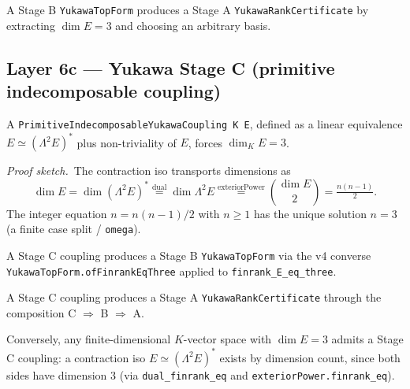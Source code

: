 \documentclass[11pt,a4paper]{article}
\begin{document}
\begin{theorem}
A Stage B \texttt{YukawaTopForm} produces a Stage A
\texttt{YukawaRankCertificate} by extracting $\dim E = 3$ and
choosing an arbitrary basis.
\end{theorem}

\subsection*{Layer 6c --- Yukawa Stage C (primitive indecomposable
coupling)}

\begin{theorem}
A \texttt{PrimitiveIndecomposableYukawaCoupling K E}, defined as
a linear equivalence $E \simeq (\Lambda^2 E)^*$ plus
non-triviality of $E$, forces $\dim_K E = 3$.

\smallskip\noindent
\emph{Proof sketch.}\ The contraction iso transports dimensions
as
\[
\dim E
  = \dim (\Lambda^2 E)^*
  \overset{\text{dual}}{=} \dim \Lambda^2 E
  \overset{\text{exteriorPower}}{=} \binom{\dim E}{2}
  = \tfrac{n(n-1)}{2}.
\]
The integer equation $n = n(n-1)/2$ with $n \ge 1$ has the
unique solution $n = 3$ (a finite case split / \texttt{omega}).
\end{theorem}

\begin{theorem}
A Stage C coupling produces a Stage B
\texttt{YukawaTopForm} via the v4 converse
\texttt{YukawaTopForm.ofFinrankEqThree} applied to
\texttt{finrank\_E\_eq\_three}.
\end{theorem}

\begin{theorem}
A Stage C coupling produces a Stage A \texttt{YukawaRankCertificate}
through the composition C $\Rightarrow$ B $\Rightarrow$ A.
\end{theorem}

\begin{theorem}
Conversely, any finite-dimensional $K$-vector space with
$\dim E = 3$ admits a Stage C coupling: a contraction iso
$E \simeq (\Lambda^2 E)^*$ exists by dimension count, since both
sides have dimension $3$ (via
\texttt{dual\_finrank\_eq} and \texttt{exteriorPower.finrank\_eq}).
\end{theorem}
\end{document}
